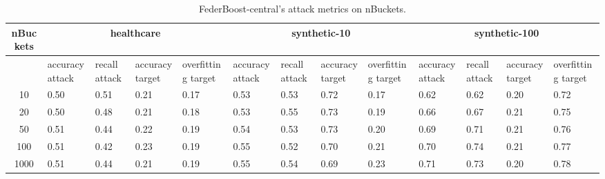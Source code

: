 \begin{table*}[]\centering
\begin{tabular}{|c| *{12}{m{1.0cm}|}}
\hline\rowcolor{gray!50}
\cellcolor{gray!80} nBuckets & \multicolumn{4}{c|}{healthcare} & \multicolumn{4}{c|}{synthetic-10} & \multicolumn{4}{c|}{synthetic-100}\\\hline 
& accuracy attack & recall attack & accuracy target & overfitting target & accuracy attack & recall attack & accuracy target & overfitting target & accuracy attack & recall attack & accuracy target & overfitting target\\\hline
10 & 0.50 & 0.51 & 0.21 & 0.17 & 0.53 & 0.53 & 0.72 & 0.17 & 0.62 & 0.62 & 0.20 & 0.72\\ \hline
20 & 0.50 & 0.48 & 0.21 & 0.18 & 0.53 & 0.55 & 0.73 & 0.19 & 0.66 & 0.67 & 0.21 & 0.75\\ \hline
50 & 0.51 & 0.44 & 0.22 & 0.19 & 0.54 & 0.53 & 0.73 & 0.20 & 0.69 & 0.71 & 0.21 & 0.76\\ \hline
100 & 0.51 & 0.42 & 0.23 & 0.19 & 0.55 & 0.52 & 0.70 & 0.21 & 0.70 & 0.74 & 0.21 & 0.77\\ \hline
1000 & 0.51 & 0.44 & 0.21 & 0.19 & 0.55 & 0.54 & 0.69 & 0.23 & 0.71 & 0.73 & 0.20 & 0.78\\ \hline
\end{tabular} 
\caption{FederBoost-central's attack metrics on nBuckets.}
\label{tab:experiment1_nBuckets}
\end{table*}
